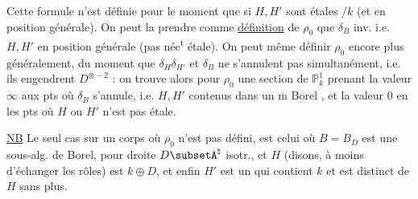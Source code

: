 Cette formule n'est définie pour le moment que si $H,H'$ sont étales /$k$ (et en position générale). On peut la prendre comme \uline{définition} de $\rho_0$  que $\delta_B$ inv. i.e. $H,H'$ en position générale (pas néc\textsuperscript{t} étale). On peut même définir $\rho_0$ encore plus généralement, du moment que $\delta_H\delta_{H'}$ et $\delta_B$ ne
s'annulent pas simultanément, i.e. ils engendrent $D^{\otimes-2}$ : on trouve alors pour $\rho_0$ une section de $\mathbb P^1_k$ prenant la valeur $\infty$ aux pts où $\delta_B$ s'annule,  i.e. $H,H'$ contenus dans un $\overline{\mathrm m}$ Borel , et la valeur $0$ en les pts où $H$ ou $H'$ n'est pas étale. 

\uline{NB} Le seul cas sur un corps où $\rho_0$ n'est pas défini, est celui où $B=B_D$ est une sous-alg. de Borel, pour droite $D\subsetA^{\natural}$  isotr., et $H$ (disons, à moins d'échanger les rôles) est $k\oplus D$, et enfin $H'$ est  un  qui contient $k$ et est distinct de $H$ sans plus.

